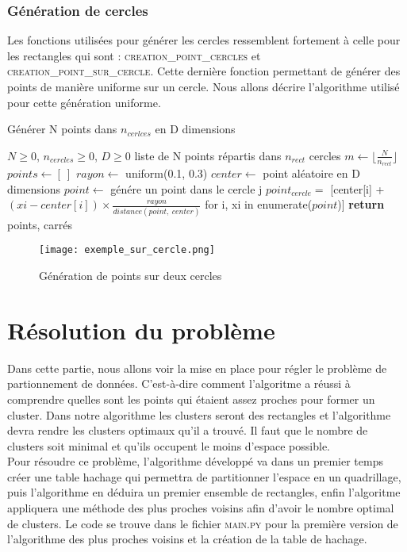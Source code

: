 \documentclass[a4paper,english,titlepage]{article}
\begin{document}
  \section{Génération de cercles}
  Les fonctions utilisées pour générer les cercles ressemblent fortement à celle pour les rectangles qui sont : \textsc{creation\_point\_cercles} et \textsc{creation\_point\_sur\_cercle}. Cette dernière fonction permettant de générer des points de manière uniforme sur un cercle. 
	  Nous allons décrire l'algorithme utilisé pour cette génération uniforme.\\

	\begin{algorithm}
		\caption{Générer N points dans $n_{cerlces}$ en D dimensions}
	\begin{algorithmic}
		\REQUIRE $N \geq 0 $, $n_{cercles} \geq 0 $, $D \geq 0$
		\ENSURE liste de N points répartis dans $n_{rect}$ cercles
		\STATE $m \leftarrow \lfloor\frac{N}{n_{rect}}\rfloor$
		\STATE $points \leftarrow [\ ]$
		\STATE $rayon \leftarrow$ uniform(0.1, 0.3)
		\STATE $center \leftarrow$ point aléatoire en D dimensions
		\STATE $point \leftarrow $ génére un point dans le cercle j
		\STATE $point_{cercle} =$ [center[i] +$(xi - center[i])\times \frac{rayon}{distance(point,\ center)}$  for i, xi in enumerate($point$)]
		\ENDFOR
		\ENDFOR
		\STATE \textbf{return} points, carrés
	\end{algorithmic}
\end{algorithm}

\begin{figure}[h!]
		\hspace*{0mm}\vfill
		\begin{center}	
		\texttt{[image: exemple\_sur\_cercle.png]}
		\caption{Génération de points sur deux cercles}
 		\end{center}  
		\vfill\hspace*{0mm}	
	\end{figure}
\newpage
	\part{Résolution du problème}
Dans cette partie, nous allons voir la mise en place pour régler le problème de partionnement de données. 
C'est-à-dire comment l'algoritme a réussi à comprendre quelles sont les points qui étaient assez proches pour former un cluster. 
Dans notre algorithme les clusters seront des rectangles et l'algorithme devra rendre les clusters optimaux qu'il a trouvé. 
Il faut que le nombre de clusters soit minimal et qu'ils occupent le moins d'espace possible.\\
Pour résoudre ce problème, l'algorithme développé va dans un premier temps créer une table hachage qui permettra de partitionner l'espace en un quadrillage,
puis l'algorithme en déduira un premier ensemble de rectangles, 
enfin l'algoritme appliquera une méthode des plus proches voisins afin d'avoir le nombre optimal de clusters.
Le code se trouve dans le fichier \textsc{main.py} pour la première version de l'algorithme des plus proches voisins et la création de la table de hachage.
\end{document}
